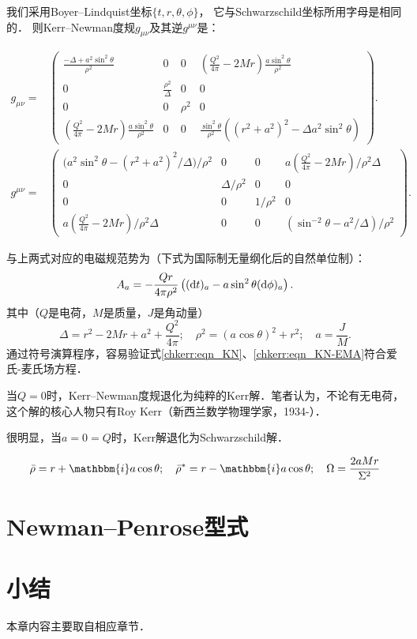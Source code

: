 我们采用Boyer--Lindquist坐标$\{t,r,\theta,\phi\}$，
它与Schwarzschild坐标所用字母是相同的．
则Kerr--Newman度规$g_{\mu\nu}$及其逆$g^{\mu\nu}$是\cite[\S 33.2]{mtw1973}：
\begin{small}
\begin{align}
 g_{\mu\nu}=& \begin{pmatrix}
    \frac{-\Delta+a^2\sin^2\theta }{\rho^2} & 0 & 0 & (\frac{Q^2}{4\pi}-2Mr)\frac{ a \sin^2\theta}{\rho^2} \\
    0 & \frac{\rho^2}{\Delta} & 0 & 0 \\
    0 & 0 & \rho^2 & 0 \\
    (\frac{Q^2}{4\pi}-2Mr)\frac{ a \sin^2\theta}{\rho^2} & 0 & 0 
    & \frac{\sin^2\theta}{\rho^2}((r^2+a^2)^2-\Delta a^2 \sin^2\theta) 
\end{pmatrix}. \label{chkerr:eqn_KN} \\
g^{\mu\nu}=& \begin{pmatrix}
	\bigl(a^2 \sin^2\theta -(r^2+a^2)^2/\Delta\bigr)/\rho^2  & 0 & 0 & a(\frac{Q^2}{4\pi}-2Mr) / \rho^2 \Delta \\
	0 & \Delta / \rho^2 & 0 & 0 \\
	0 & 0 & 1 / \rho^2 & 0 \\
	a(\frac{Q^2}{4\pi}-2Mr) / \rho^2 \Delta & 0 & 0 & (\sin^{-2} \theta -a^2/\Delta) / \rho^2 
\end{pmatrix}. \label{chkerr:eqn_KN-inv}
\end{align} \end{small}
与上两式对应的电磁规范势为（下式为国际制无量纲化后的自然单位制）：
\begin{equation}\label{chkerr:eqn_KN-EMA}
    A_a= -\frac{Q r}{{4 \pi} \rho^2 } \left(({\rm d}t)_a - a \sin ^2\theta ({\rm d}\phi)_a \right) .
\end{equation}
其中（$Q$是电荷，$M$是质量，$J$是角动量）
\begin{equation}
    \Delta =r^2-2M r +a^2+ \frac{Q^2 }{4\pi };\quad
    \rho^2=\left(a \cos \theta \right)^2+r^2;\quad
    a=\frac{J}{M}.
\end{equation}
通过符号演算程序，容易验证式\eqref{chkerr:eqn_KN}、\eqref{chkerr:eqn_KN-EMA}符合爱氏-麦氏场方程．

当$Q=0$时，Kerr--Newman度规退化为纯粹的Kerr解．笔者认为，不论有无电荷，
这个解的核心人物只有Roy Kerr（新西兰数学物理学家，1934-）．




很明显，当$a=0=Q$时，Kerr解退化为Schwarzschild解．


\begin{equation}
    \bar{\rho} =r+\mathbbm{i} a \cos\theta ;\quad 
\bar{\rho}^* =r-\mathbbm{i} a \cos \theta ;\quad
\Omega =\frac{2 a M r}{\Sigma^2}
\end{equation}


\section{Newman--Penrose型式}

\section*{小结}
本章内容主要取自\parencite{chandrasekhar-1983}相应章节．


\printbibliography[heading=subbibliography,title=第\ref{chkerr}章参考文献]

\endinput
